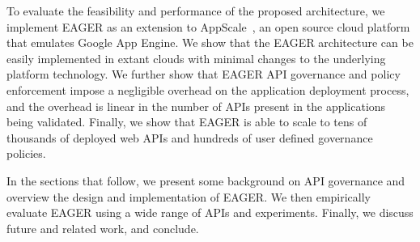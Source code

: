 To evaluate the feasibility and performance of the proposed 
architecture, we implement EAGER as an extension to AppScale~\cite{appscale13}, 
an open source
cloud platform that emulates Google App Engine. We show that the EAGER 
architecture can be easily implemented in extant clouds with
minimal changes to the underlying platform technology. We further show that 
EAGER API governance and policy enforcement impose a negligible 
overhead on the application deployment process, and the overhead
is linear in the number of APIs present in the applications being validated.  
Finally, we show that EAGER is able to
scale to tens of thousands of deployed web APIs and hundreds of user 
defined governance policies.

In the sections that follow, we present some background on API governance
and overview the design and implementation of
EAGER. We then empirically evaluate EAGER using a wide range of APIs and
experiments.  Finally, we discuss future and related work, and conclude.

